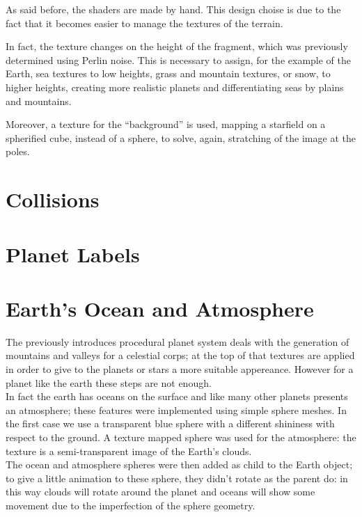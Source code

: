 \documentclass[paper=a4, fontsize=11pt]{scrartcl} %
\numberwithin{equation}{section} %
\numberwithin{figure}{section} %
\numberwithin{table}{section} %
\theoremstyle{definition}
\begin{document}
As said before, the shaders are made by hand. This design choise is due to
the fact that it becomes easier to manage the textures of the terrain.

In fact, the texture changes on the height of the fragment, which was previously
determined using Perlin noise. This is necessary to assign, for the example
of the Earth, sea textures to low
heights, grass and mountain textures, or snow, to higher heights, creating
more realistic planets and differentiating seas by plains and mountains.

Moreover, a texture for the ``background'' is used, mapping a starfield on a
spherified cube, instead of a sphere, to solve, again, stratching of the image at the poles.


\section{Collisions}



\section{Planet Labels}


\section{Earth's Ocean and Atmosphere}
The previously introduces procedural planet system deals with the generation of mountains and valleys for a celestial corps; at the top of that textures are applied in order to give to the planets or stars a more suitable appereance. However for a planet like the earth these steps are not enough.\\
In fact the earth has oceans on the surface and like many other planets presents an atmosphere; these features were implemented using simple sphere meshes. In the first case we use a transparent blue sphere with a different shininess with respect to the ground. A texture mapped sphere was used for the atmosphere: the texture is a semi-transparent image of the Earth's clouds.\\
The ocean and atmosphere spheres were then added as child to the Earth object; to give a little animation to these sphere, they didn't rotate as the parent do: in this way clouds will rotate around the planet and oceans will show some movement due to the imperfection of the sphere geometry.
\end{document}
